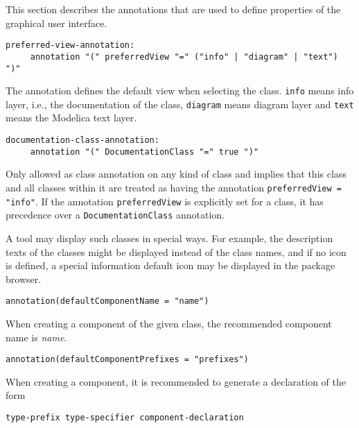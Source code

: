This section describes the annotations that are used to define properties of the graphical user interface.

\begin{lstlisting}[language=grammar]
  preferred-view-annotation:
     annotation "(" preferredView "=" ("info" | "diagram" | "text") ")"
\end{lstlisting}

The  annotation defines the default view when selecting the class.
\lstinline!info! means info layer, i.e., the documentation of the class, \lstinline!diagram! means diagram layer and \lstinline!text! means the Modelica text layer.

\begin{lstlisting}[language=grammar]
  documentation-class-annotation:
     annotation "(" DocumentationClass "=" true ")"
\end{lstlisting}%

Only allowed as class annotation on any kind of class and implies that this class and all classes within it are treated as having the annotation \lstinline!preferredView = "info"!.
If the annotation \lstinline!preferredView! is explicitly set for a class, it has precedence over a \lstinline!DocumentationClass! annotation.

\begin{nonnormative}
A tool may display such classes in special ways.  For example, the description texts of the classes might be displayed instead
of the class names, and if no icon is defined, a special information default icon may be displayed in the package browser.
\end{nonnormative}

\begin{lstlisting}[language=modelica]
 annotation(defaultComponentName = "name")
\end{lstlisting}%

When creating a component of the given class, the recommended component name is \emph{name}.

\begin{lstlisting}[language=modelica]
annotation(defaultComponentPrefixes = "prefixes")
\end{lstlisting}%

When creating a component, it is recommended to generate a declaration of the form
\begin{lstlisting}[language=grammar]
type-prefix type-specifier component-declaration
\end{lstlisting}

